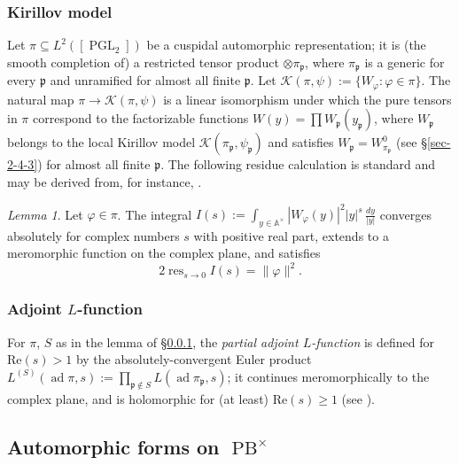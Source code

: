 \documentclass[reqno,10pt]{amsart}
\theoremstyle{plain} %
\theoremstyle{definition}
\theoremstyle{plain} %
\theoremstyle{remark}
\theoremstyle{itplain} %
\newtheorem*{lemma*}{Lemma}
\theoremstyle{remark} %
\renewcommand{\Re}{\mathrm{Re}}
\renewcommand{\geq}{\geqslant}
\numberwithin{equation}{section}
\DeclareMathOperator{\ad}{ad}
\def\PB{\operatorname{PB}}
\def\PGL{\operatorname{PGL}}
\DeclareMathOperator{\res}{res}
\begin{document}
\subsubsection{Kirillov model}
\label{sec-3-3-2}
Let $\pi \subseteq L^2([\PGL_2])$ be a cuspidal automorphic representation; it is (the smooth completion of) a restricted tensor product $\otimes \pi_\mathfrak{p}$, where $\pi_\mathfrak{p}$ is a generic for every $\mathfrak{p}$ and unramified for almost all finite $\mathfrak{p}$.  Let $\mathcal{K}(\pi,\psi) := \{W_\varphi : \varphi \in \pi \}$.  The natural map $\pi \rightarrow \mathcal{K}(\pi,\psi)$ is a linear isomorphism under which the pure tensors in $\pi$ correspond to the factorizable functions $W(y) = \prod W_\mathfrak{p}(y_\mathfrak{p})$, where $W_\mathfrak{p}$ belongs to the local Kirillov model $\mathcal{K}(\pi_\mathfrak{p},\psi_\mathfrak{p})$ and satisfies $W_\mathfrak{p} = W_{\pi_\mathfrak{p}}^0$ (see \S\ref{sec-2-4-3}) for almost all finite $\mathfrak{p}$.  The following residue calculation is standard and may be derived from, for instance, \cite[Lem 2.2.3]{michel-2009}.
\begin{lemma*}\label{lem:inner-product-formula-petersson-vs-kirillov}
  Let $\varphi \in \pi$.  The integral $I(s) := \int_{y \in \mathbb{A}^\times} |W_\varphi(y)|^2 |y|^s \, \frac{d y}{|y|}$ converges absolutely for complex numbers $s$ with positive real part, extends to a meromorphic function on the complex plane, and satisfies
  \begin{equation}\label{eqn:rs-ipf}
    2 \res_{s \rightarrow 0} I(s) = \|\varphi\|^2.
  \end{equation}
\end{lemma*}

\subsubsection{Adjoint $L$-function}
\label{sec:adjoint-l-function}
For $\pi$, $S$ as in the lemma of \S\ref{sec-3-3-2}, the \emph{partial adjoint $L$-function} is defined for $\Re(s) > 1$ by the absolutely-convergent Euler product $L^{(S)}(\ad \pi,s) := \prod_{\mathfrak{p} \notin S} L(\ad \pi_\mathfrak{p},s)$; it continues meromorphically to the complex plane, and is holomorphic for (at least) $\Re(s) \geq 1$ (see \cite{MR533066}).


\subsection{Automorphic forms on $\PB^\times$}
\label{sec-3-4}
\end{document}
